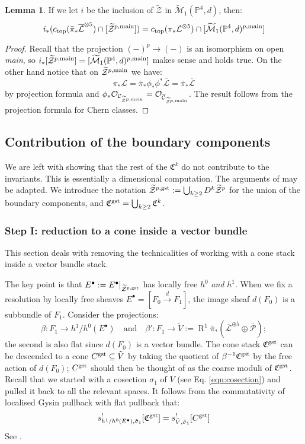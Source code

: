 \documentclass[11pt]{amsart}
\newcommand{\pazocal}{\mathcal}
\newcommand{\tM}{\widetilde{\mathcal{M}}}
\newcommand{\tZ}{\widetilde{\pazocal Z}}
\newcommand{\tZp}{\widetilde{\pazocal Z}^p}
\newcommand{\PP}{\mathbb P}
\newcommand{\OO}{\mathcal{O}}
\renewcommand{\to}{\rightarrow}
\newcommand{\cC}{\mathcal{C}}
\newcommand{\hC}{\overline{\mathcal{C}}}
\newcommand{\hL}{\overline{\mathcal{L}}}
\theoremstyle{definition}
\newtheorem{lem}[thm]{Lemma}
\theoremstyle{definition}
\begin{document}
\begin{lem}\label{lem:main-compo}
 If we let $i$ be the inclusion of $\tZ$ in $\tM_1(\PP^4,d)$, then:
 \[
  i_*(c_{\rm{top}}(\bar{\pi}_*\hL^{\otimes 5})\cap[\tZ^{p,\rm{main}}])=c_{\rm{top}}({\pi}_*\mathcal L^{\otimes 5})\cap[\tM_1(\PP^4,d)^{p,\rm{main}}]
 \]
\end{lem}
\begin{proof}
 Recall that the projection $(-)^p\to (-)$ is an isomorphism on open \emph{main}, so $i_*[\tZ^{p,\rm{main}}]=[\tM_1(\PP^4,d)^{p,\rm{main}}]$ makes sense and holds true. On the other hand notice that on $\tZ^{p,\rm{main}}$ we have:
 \[
  \pi_*\mathcal L=\bar{\pi}_*\phi_*\phi^*\hL=\bar{\pi}_*\hL
 \]
by projection formula and $\phi_*\OO_{\cC_{\tZ^{p,\rm{main}}}}=\OO_{\hC_{\tZ^{p,\rm{main}}}}$. The result follows from the projection formula for Chern classes.
\end{proof}

\subsection{Contribution of the boundary components} We are left with showing that the rest of the $\mathfrak C^k$ do not contribute to the invariants. This is essentially a dimensional computation. The arguments of \cite[\S\S6-8]{CLpfields} may be adapted. We introduce the notation $\tZ^{p,\rm{gst}}:=\bigcup_{k\geq 2} D^k\tZp$ for the union of the boundary components, and $\mathfrak C^{\rm{gst}}=\bigcup_{k\geq 2}\mathfrak C^k$.

\subsubsection{Step I: reduction to a cone inside a vector bundle}

This section deals with removing the technicalities of working with a cone stack inside a vector bundle stack.

The key point is that $E^{\bullet}:=E^{\bullet}\rvert_{\tZ^{p,\rm{gst}}}$ has locally free $h^0$ \emph{and} $h^1$. When we fix a resolution by locally free sheaves $E^{\bullet}=[F_0\xrightarrow{d} F_1]$, the image sheaf $d(F_0)$ is a subbundle of $F_1$. Consider the projections:
\[
 \beta\colon F_1\to h^1/h^0(E^{\bullet}) \quad \text{and} \quad \beta'\colon F_1\to \tilde{V}:=\operatorname{R}^1\bar{\pi}_*(\hL^{\oplus 5}\oplus\overline{\mathcal P});
\]
the second is also flat since $d(F_0)$ is a vector bundle. The cone stack $\mathfrak C^{\rm{gst}}$ can be descended to a cone $C^{\rm{gst}}\subseteq \tilde{V}$ by taking the quotient of $\beta^{-1}\mathfrak C^{\rm{gst}}$ by the free action of $d(F_0)$; $C^{\rm{gst}}$ should then be thought of as the coarse moduli of $\mathfrak C^{\rm{gst}}$. Recall that we started with a cosection $\sigma_1$ of $V$ (see Eq. \eqref{eqn:cosection}) and pulled it back to all the relevant spaces. 
It follows from the commutativity of localised Gysin pullback with flat pullback that:
\[
 s^!_{h^1/h^0(E^{\bullet}),\tilde\sigma_1}[\mathfrak C^{\rm{gst}}]= s^!_{\tilde V,\tilde\sigma_1}[C^{\rm{gst}}]
\]
See \cite[Proposition 6.3]{CLpfields}.
\end{document}
